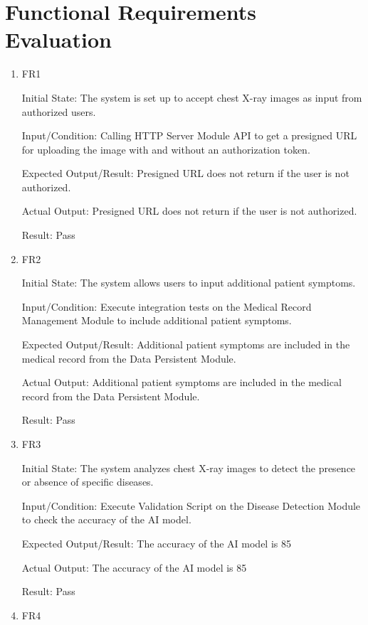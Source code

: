 \documentclass[12pt, titlepage]{article}
\begin{document}
\newpage


\section{Functional Requirements Evaluation}

\begin{enumerate}
\item{FR1}

Initial State: The system is set up to accept chest X-ray images as input from authorized users.

Input/Condition: Calling HTTP Server Module API to get a presigned URL for uploading the image with and without an authorization token.

Expected Output/Result: Presigned URL does not return if the user is not authorized.

Actual Output: Presigned URL does not return if the user is not authorized.

Result: Pass

\item{FR2}

Initial State: The system allows users to input additional patient symptoms.

Input/Condition: Execute integration tests on the Medical Record Management Module to include additional patient symptoms.

Expected Output/Result: Additional patient symptoms are included in the medical record from the Data Persistent Module.

Actual Output: Additional patient symptoms are included in the medical record from the Data Persistent Module.

Result: Pass

\item{FR3}

Initial State: The system analyzes chest X-ray images to detect the presence or absence of specific diseases.

Input/Condition: Execute Validation Script on the Disease Detection Module to check the accuracy of the AI model.

Expected Output/Result: The accuracy of the AI model is 85%

Actual Output: The accuracy of the AI model is 85%

Result: Pass

\item{FR4}


\end{enumerate}
\end{document}
